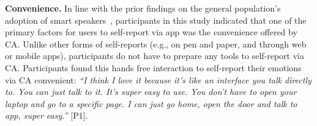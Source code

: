         \textbf{Convenience. }
        In line with the prior findings on the general population's adoption of smart speakers~\cite{lau2018alexa}, participants in this study indicated that one of the primary factors for users to self-report via \acl{app} was the convenience offered by \ac{CA}.
        Unlike other forms of self-reports (e.g., on pen and paper, and through web or mobile apps), participants do not have to prepare any tools to self-report via \ac{CA}. Participants found this hands free interaction to self-report their emotions via \ac{CA} convenient:
            \textit{
            ``I think I love it because it’s like an interface you talk directly to. You can just talk to it. It’s super easy to use. You don’t have to open your laptop and go to a specific page. I can just go home, open the door and talk to \acl{app}, super easy.'' 
            }
            [P1].
        

        

